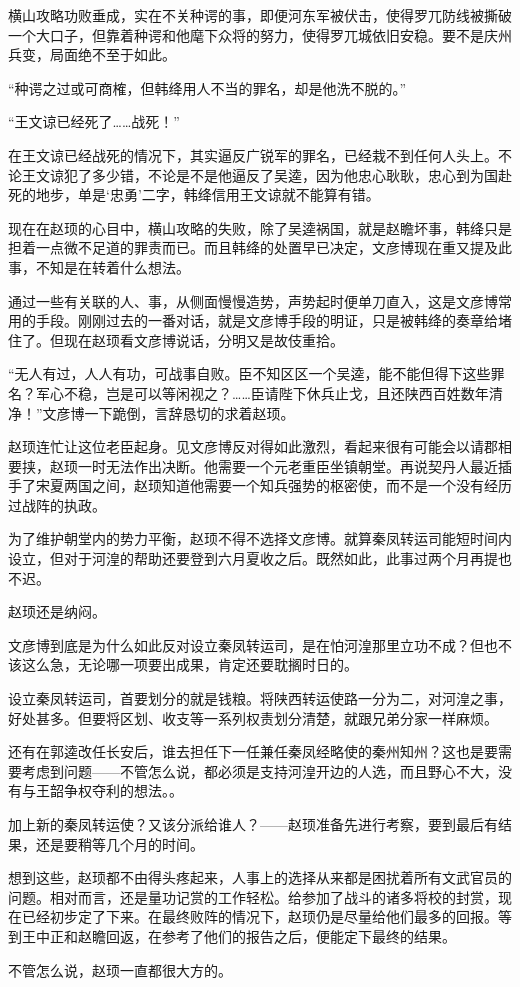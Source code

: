 横山攻略功败垂成，实在不关种谔的事，即便河东军被伏击，使得罗兀防线被撕破一个大口子，但靠着种谔和他麾下众将的努力，使得罗兀城依旧安稳。要不是庆州兵变，局面绝不至于如此。

“种谔之过或可商榷，但韩绛用人不当的罪名，却是他洗不脱的。”

“王文谅已经死了……战死！”

在王文谅已经战死的情况下，其实逼反广锐军的罪名，已经栽不到任何人头上。不论王文谅犯了多少错，不论是不是他逼反了吴逵，因为他忠心耿耿，忠心到为国赴死的地步，单是‘忠勇’二字，韩绛信用王文谅就不能算有错。

现在在赵顼的心目中，横山攻略的失败，除了吴逵祸国，就是赵瞻坏事，韩绛只是担着一点微不足道的罪责而已。而且韩绛的处置早已决定，文彦博现在重又提及此事，不知是在转着什么想法。

通过一些有关联的人、事，从侧面慢慢造势，声势起时便单刀直入，这是文彦博常用的手段。刚刚过去的一番对话，就是文彦博手段的明证，只是被韩绛的奏章给堵住了。但现在赵顼看文彦博说话，分明又是故伎重拾。

“无人有过，人人有功，可战事自败。臣不知区区一个吴逵，能不能但得下这些罪名？军心不稳，岂是可以等闲视之？……臣请陛下休兵止戈，且还陕西百姓数年清净！”文彦博一下跪倒，言辞恳切的求着赵顼。

赵顼连忙让这位老臣起身。见文彦博反对得如此激烈，看起来很有可能会以请郡相要挟，赵顼一时无法作出决断。他需要一个元老重臣坐镇朝堂。再说契丹人最近插手了宋夏两国之间，赵顼知道他需要一个知兵强势的枢密使，而不是一个没有经历过战阵的执政。

为了维护朝堂内的势力平衡，赵顼不得不选择文彦博。就算秦凤转运司能短时间内设立，但对于河湟的帮助还要登到六月夏收之后。既然如此，此事过两个月再提也不迟。

赵顼还是纳闷。

文彦博到底是为什么如此反对设立秦凤转运司，是在怕河湟那里立功不成？但也不该这么急，无论哪一项要出成果，肯定还要耽搁时日的。

设立秦凤转运司，首要划分的就是钱粮。将陕西转运使路一分为二，对河湟之事，好处甚多。但要将区划、收支等一系列权责划分清楚，就跟兄弟分家一样麻烦。

还有在郭逵改任长安后，谁去担任下一任兼任秦凤经略使的秦州知州？这也是要需要考虑到问题——不管怎么说，都必须是支持河湟开边的人选，而且野心不大，没有与王韶争权夺利的想法。。

加上新的秦凤转运使？又该分派给谁人？——赵顼准备先进行考察，要到最后有结果，还是要稍等几个月的时间。

想到这些，赵顼都不由得头疼起来，人事上的选择从来都是困扰着所有文武官员的问题。相对而言，还是量功记赏的工作轻松。给参加了战斗的诸多将校的封赏，现在已经初步定了下来。在最终败阵的情况下，赵顼仍是尽量给他们最多的回报。等到王中正和赵瞻回返，在参考了他们的报告之后，便能定下最终的结果。

不管怎么说，赵顼一直都很大方的。

